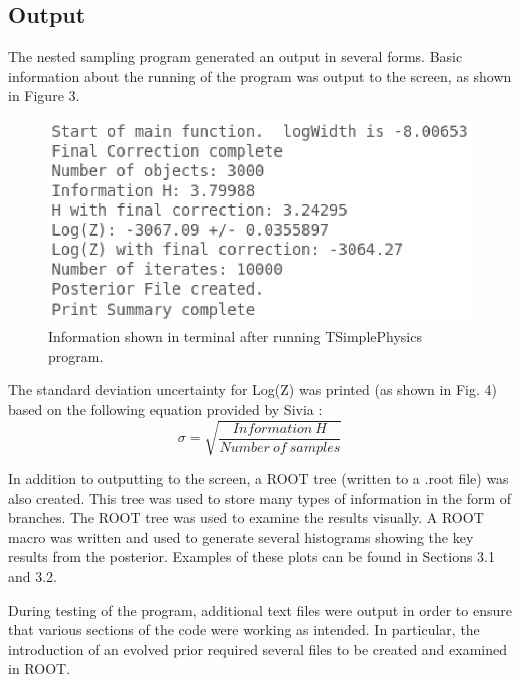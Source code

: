 \documentclass[a4paper,12pt]{article}
\begin{document}

\subsection{Output}
The nested sampling program generated an output in several forms.  Basic information about the running of the program was output to the screen, as shown in Figure 3.

\begin{figure}[!h]
 \begin{center}
  \includegraphics[scale=0.8]{term_output.eps}
  \caption{Information shown in terminal after running TSimplePhysics program.}
 \end{center}
\end{figure}

The standard deviation uncertainty for Log(Z) was printed (as shown in Fig. 4) based on the following equation provided by Sivia \cite{sivia}:
\begin{equation}
 \sigma = \sqrt{\frac{Information\  H}{Number\  of\  samples}}
\end{equation}


In addition to outputting to the screen, a ROOT tree (written to a .root file) was also created.  This tree was used to store many types of information in the form of branches.  The ROOT tree was used to examine the results visually.  A ROOT macro was written and used to generate several histograms showing the key results from the posterior.  Examples of these plots can be found in Sections 3.1 and 3.2.


During testing of the program, additional text files were output in order to ensure that various sections of the code were working as intended.  In particular, the introduction of an evolved prior required several files to be created and examined in ROOT.
\end{document}
